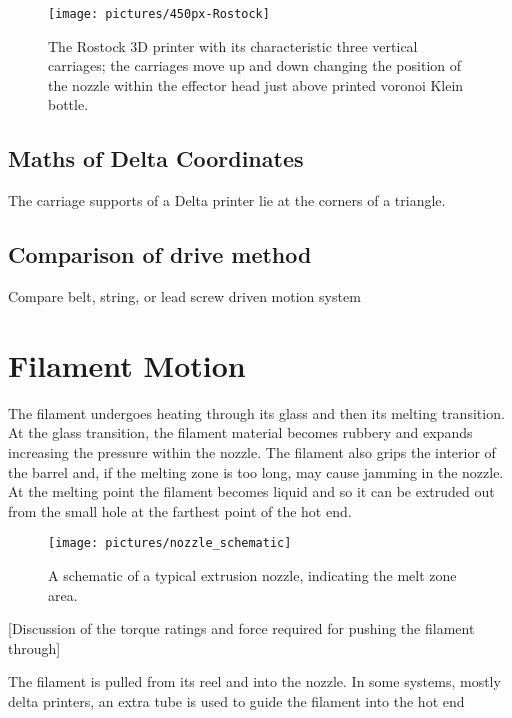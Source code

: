 \begin{figure}
\centering
\texttt{[image: pictures/450px-Rostock]}
\caption{The Rostock 3D printer with its characteristic three vertical carriages; the carriages move up and down changing the position of the nozzle within the effector head just above printed voronoi Klein bottle. }
\label{fig:rostock}
\end{figure}


\subsection{Maths of Delta Coordinates}

The carriage supports of a Delta printer lie at the corners of a triangle. 


\subsection{Comparison of drive method}

Compare belt, string, or lead screw driven motion system


\section{Filament Motion}

The filament undergoes heating through its glass and then its melting transition. At the glass transition, the filament material becomes rubbery and expands increasing the pressure within the nozzle. The filament also grips the interior of the barrel and, if the melting zone is too long, may cause jamming in the nozzle. At the melting point the filament becomes liquid and so it can be extruded out from the small hole at the farthest point of the hot end. 

\begin{figure}
\centering
\texttt{[image: pictures/nozzle\_schematic]}
\caption{A schematic of a typical extrusion nozzle, indicating the melt zone area.}
\label{fig:nozzle_schematic}
\end{figure}

[Discussion of the torque ratings and force required for pushing the filament through]

The filament is pulled from its reel and into the nozzle. In some systems, mostly delta printers, an extra tube is used to guide the filament into the hot end

